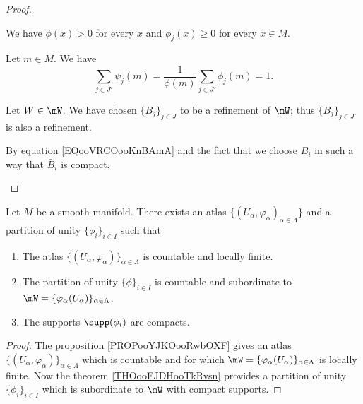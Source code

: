 \begin{proof}
\begin{subproof}
\begin{subproof}

			We have \( \phi(x)>0\) for every \( x\) and \( \phi_j(x)\geq 0 \) for every \( x\in M\).


			Let \( m\in M\). We have
			\begin{equation}
				\sum_{j\in J'}\psi_j(m)=\frac{1}{ \phi(m)}\sum_{j\in J'}\phi_j(m)=1.
			\end{equation}


			Let \( W\in\mW\). We have chosen \( \{ B_j \}_{j\in J}\) to be a refinement of \( \mW\); thus \( \{ \bar B_j \}_{j\in J'}\) is also a refinement.

			By equation \ref{EQooVRCOooKnBAmA} and the fact that we choose \( B_i\) in such a way that \( \bar B_i\) is compact.
		\end{subproof}
	\end{subproof}
\end{proof}

\begin{proposition}		\label{PROPooGEWIooTwCfPp}
	Let \( M\) be a smooth manifold. There exists an atlas \( \{ (U_{\alpha},\varphi_{\alpha})_{\alpha\in \Lambda} \}\) and a partition of unity \( \{ \phi_i \}_{i\in I}\) such that
	\begin{enumerate}
		\item
		      The atlas \( \{ (U_{\alpha},\varphi_{\alpha}) \}_{\alpha\in \Lambda}\) is countable and locally finite.
		\item
		      The partition of unity \( \{ \phi \}_{i\in I}\)  is countable and subordinate to \( \mW=\{ \varphi_{\alpha}(U_{\alpha}) \}_{\alpha\in \Lambda}\).
		\item
		      The supports \( \supp(\phi_i)\) are compacts.
	\end{enumerate}
\end{proposition}

\begin{proof}
	The proposition \ref{PROPooYJKOooRwbOXF} gives an atlas \( \{ (U_{\alpha}, \varphi_{\alpha}) \}_{\alpha\in \Lambda}\) which is countable and for which \( \mW=\{ \varphi_{\alpha}(U_{\alpha}) \}_{\alpha\in \Lambda}\) is locally finite. Now the theorem \ref{THOooEJDHooTkRvsn} provides a partition of unity \( \{ \phi_i \}_{i\in I}\) which is subordinate to \( \mW\) with compact supports.
\end{proof}

